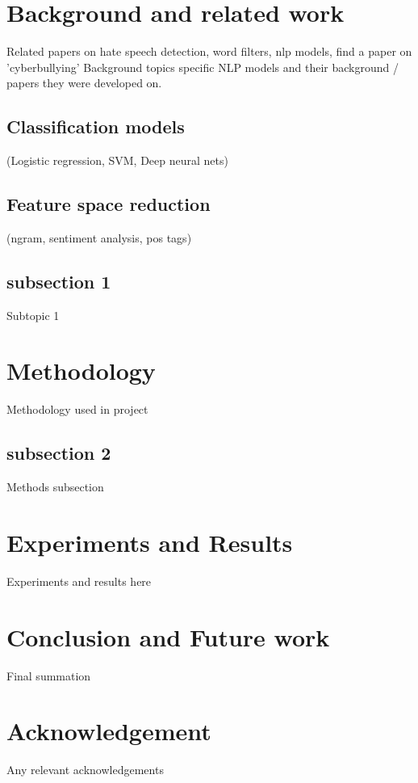 \documentclass[conference]{IEEEtran}
\begin{document}
\section{Background and related work}
Related papers on hate speech detection, word filters, nlp models, find a paper on 'cyberbullying'
Background topics
specific NLP models and their background / papers they were developed on.

\subsection{Classification models}
(Logistic regression, SVM, Deep neural nets)

\subsection{Feature space reduction}
(ngram, sentiment analysis, pos tags)

\subsection{subsection 1}
Subtopic 1

\section{Methodology}
Methodology used in project

\subsection{subsection 2}\label{AA}
Methods subsection

\section{Experiments and Results}
Experiments and results here

\section{Conclusion and Future work}
Final summation

\section*{Acknowledgement}

Any relevant acknowledgements
\end{document}
